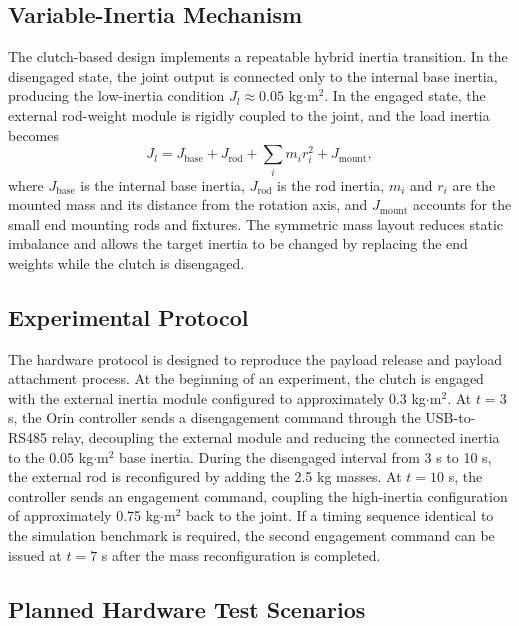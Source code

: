 \documentclass[letterpaper,journal]{IEEEtran}
\begin{document}
\subsection{Variable-Inertia Mechanism}

The clutch-based design implements a repeatable hybrid inertia transition. In the disengaged state, the joint output is connected only to the internal base inertia, producing the low-inertia condition $J_l \approx 0.05$ kg$\cdot$m$^2$. In the engaged state, the external rod-weight module is rigidly coupled to the joint, and the load inertia becomes
\begin{equation}
J_l = J_{\text{base}} + J_{\text{rod}} + \sum_i m_i r_i^2 + J_{\text{mount}},
\label{eq:testbench_inertia}
\end{equation}
where $J_{\text{base}}$ is the internal base inertia, $J_{\text{rod}}$ is the rod inertia, $m_i$ and $r_i$ are the mounted mass and its distance from the rotation axis, and $J_{\text{mount}}$ accounts for the small end mounting rods and fixtures. The symmetric mass layout reduces static imbalance and allows the target inertia to be changed by replacing the end weights while the clutch is disengaged.

\subsection{Experimental Protocol}

The hardware protocol is designed to reproduce the payload release and payload attachment process. At the beginning of an experiment, the clutch is engaged with the external inertia module configured to approximately 0.3 kg$\cdot$m$^2$. At $t=3$ s, the Orin controller sends a disengagement command through the USB-to-RS485 relay, decoupling the external module and reducing the connected inertia to the 0.05 kg$\cdot$m$^2$ base inertia. During the disengaged interval from 3 s to 10 s, the external rod is reconfigured by adding the 2.5 kg masses. At $t=10$ s, the controller sends an engagement command, coupling the high-inertia configuration of approximately 0.75 kg$\cdot$m$^2$ back to the joint. If a timing sequence identical to the simulation benchmark is required, the second engagement command can be issued at $t=7$ s after the mass reconfiguration is completed.

\subsection{Planned Hardware Test Scenarios}
\end{document}
